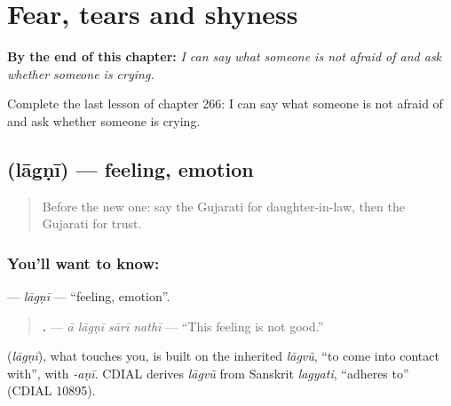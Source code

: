 
\chapter{Fear, tears and shyness}
\label{ch:gu-fear-tears-and-shyness}

\begin{chapteropening}
\textbf{By the end of this chapter:} \emph{I can say what someone is not afraid of and ask whether someone is crying.}

Complete the last lesson of chapter 266: I can say what someone is not afraid of and ask whether someone is crying.
\end{chapteropening}

\section[\texorpdfstring{\gu{લાગણી} (lāgṇī)}{લાગણી (lāgṇī)}]{ (lāgṇī) — feeling, emotion}

\label{lesson:GU-C266-lagni}



\begin{quote}
Before the new one: say the Gujarati for daughter-in-law, then the Gujarati for trust.
\end{quote}

\subsection*{You'll want to know: }
\textbf{} — \emph{lāgṇī} — \textquotedblleft{}feeling, emotion\textquotedblright{}.

\begin{quote}
\textbf{   .} — \emph{ā lāgṇī sārī nathī} — \textquotedblleft{}This feeling is not good.\textquotedblright{}
\end{quote}

\begin{cousinweb}
\textbf{} (\emph{lāgṇī}), what touches you, is built on the inherited \emph{lāgvũ}, \textquotedblleft{}to come into contact with\textquotedblright{}, with \emph{-aṇī}. CDIAL derives \emph{lāgvũ} from Sanskrit \emph{lagyati}, \textquotedblleft{}adheres to\textquotedblright{} (CDIAL 10895).
\end{cousinweb}

